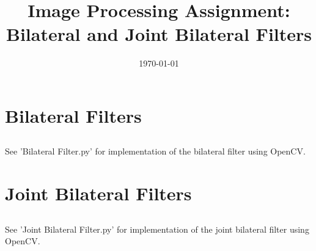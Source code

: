 \documentclass{article}
\begin{document}
	\title{Image Processing Assignment: Bilateral and Joint Bilateral Filters}
	\date{\printdayoff\today}
	\maketitle
	\newpage
	\section{Bilateral Filters}
	\subsection{}
	
	\subsection{}
	See 'Bilateral Filter.py' for implementation of the bilateral filter using OpenCV.
	
	\subsection{}	
	\newpage
	\section{Joint Bilateral Filters}
	\subsection{}
	
	\subsection{}
	See 'Joint Bilateral Filter.py' for implementation of the joint bilateral filter using OpenCV.
	
	\subsection{}
\end{document}
